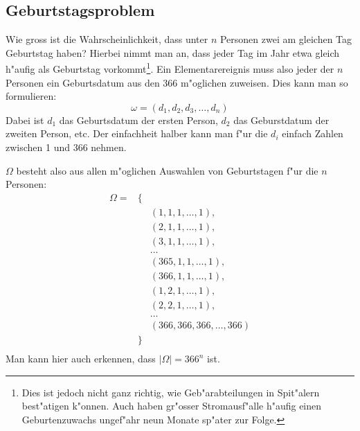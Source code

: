 \subsection{Geburtstagsproblem}
Wie gross ist die Wahrscheinlichkeit, dass unter $n$ Personen zwei
am gleichen Tag Geburtstag haben? Hierbei nimmt man an, dass
jeder Tag im Jahr etwa gleich h"aufig als Geburtstag
vorkommt\footnote{Dies ist
jedoch nicht ganz richtig, wie Geb"arabteilungen in Spit"alern
best"atigen k"onnen. Auch haben gr"osser Stromausf"alle h"aufig
einen Geburtenzuwachs ungef"ahr neun Monate sp"ater zur Folge.}.
Ein Elementarereignis muss also jeder der $n$ Personen ein
Geburtsdatum aus den $366$ m"oglichen zuweisen. Dies kann man so
formulieren:
\[
\omega=(d_1, d_2, d_3,\dots,d_n)
\]
Dabei ist $d_1$ das Geburtsdatum der ersten Person, $d_2$ das
Geburstdatum der zweiten Person, etc. Der einfachheit halber kann
man f"ur die $d_i$ einfach Zahlen zwischen 1 und 366 nehmen.

$\Omega$ besteht also aus allen m"oglichen Auswahlen von Geburtstagen
f"ur die $n$ Personen:
\begin{eqnarray*}
\Omega=&\{&\\
&&(1,1,1,\dots,1),\\
&&(2,1,1,\dots,1),\\
&&(3,1,1,\dots,1),\\
&&\dots\\
&&(365,1,1,\dots,1),\\
&&(366,1,1,\dots,1),\\
&&(1,2,1,\dots,1),\\
&&(2,2,1,\dots,1),\\
&&\dots\\
&&(366,366,366,\dots,366)\\
&\}&\\
\end{eqnarray*}
Man kann hier auch erkennen, dass $|\Omega|=366^n$ ist.

